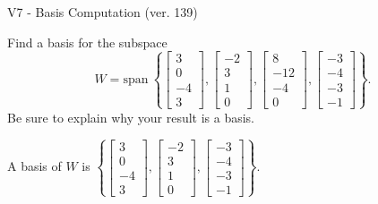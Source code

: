 \begin{exercise}
  \begin{exerciseTitle}V7 - Basis Computation (ver. 139)\end{exerciseTitle}
  \begin{exerciseStatement}
    Find a basis for the subspace 
\[W=\mathrm{span}\ \left\{\left[\begin{array}{r}
3 \\
0 \\
-4 \\
3
\end{array}\right] , \left[\begin{array}{r}
-2 \\
3 \\
1 \\
0
\end{array}\right] , \left[\begin{array}{r}
8 \\
-12 \\
-4 \\
0
\end{array}\right] , \left[\begin{array}{r}
-3 \\
-4 \\
-3 \\
-1
\end{array}\right]\right\}.\]
 Be sure to explain why your result is a basis.


  \end{exerciseStatement}
  \begin{exerciseAnswer}
   A basis of \(W\) is  \(\left\{\left[\begin{array}{r}
3 \\
0 \\
-4 \\
3
\end{array}\right] , \left[\begin{array}{r}
-2 \\
3 \\
1 \\
0
\end{array}\right] , \left[\begin{array}{r}
-3 \\
-4 \\
-3 \\
-1
\end{array}\right]\right\}\).
  


  \end{exerciseAnswer}
\end{exercise}